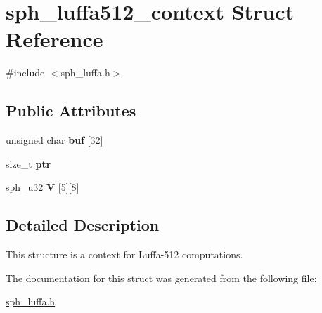 \hypertarget{structsph__luffa512__context}{}\section{sph\+\_\+luffa512\+\_\+context Struct Reference}
\label{structsph__luffa512__context}


{\ttfamily \#include $<$sph\+\_\+luffa.\+h$>$}

\subsection*{Public Attributes}
\begin{DoxyCompactItemize}
\item 
\mbox{\label{structsph__luffa512__context_a5af7f6fd6cb6e0986911049bff8e4c72}} 
unsigned char {\bfseries buf} \mbox{[}32\mbox{]}
\item 
\mbox{\label{structsph__luffa512__context_a27838c5d89d8247efd7e3fcf9635906b}} 
size\+\_\+t {\bfseries ptr}
\item 
\mbox{\label{structsph__luffa512__context_a458e771cc64352f102a52bb59fc66dc4}} 
sph\+\_\+u32 {\bfseries V} \mbox{[}5\mbox{]}\mbox{[}8\mbox{]}
\end{DoxyCompactItemize}


\subsection{Detailed Description}
This structure is a context for Luffa-\/512 computations. 

The documentation for this struct was generated from the following file\+:\begin{DoxyCompactItemize}
\item 
\mbox{\hyperlink{sph__luffa_8h}{sph\+\_\+luffa.\+h}}\end{DoxyCompactItemize}
